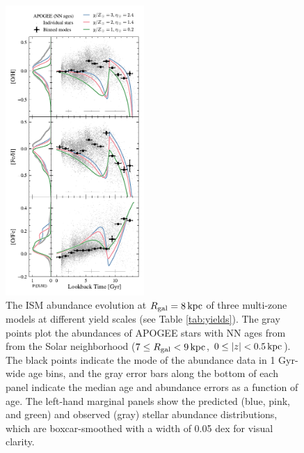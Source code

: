 \documentclass[twocolumn,twocolappendix,linenumbers]{aastex631}
\newcommand{\kpc}{\,{\rm kpc}}
\newcommand{\onecolumn}{0.47\textwidth}
\begin{document}
\begin{figure}
    \centering
    \includegraphics[width=\onecolumn]{figures/gas_abundance_evolution.pdf}
    \caption{The ISM abundance evolution at $R_{\rm gal}=8\kpc$ of three multi-zone models at different yield scales (see Table \ref{tab:yields}). The gray points plot the abundances of APOGEE stars with NN ages from \citet{leung_variational_2023} from the Solar neighborhood ($7\leq R_{\rm gal}<9\kpc$, $0\leq|z|<0.5\kpc$). The black points indicate the mode of the abundance data in 1 Gyr-wide age bins, and the gray error bars along the bottom of each panel indicate the median age and abundance errors as a function of age. The left-hand marginal panels show the predicted (blue, pink, and green) and observed (gray) stellar abundance distributions, which are boxcar-smoothed with a width of 0.05 dex for visual clarity.
}
\end{figure}
\end{document}
